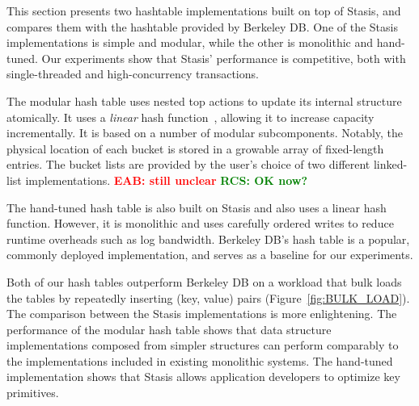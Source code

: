 \documentclass[letterpaper,twocolumn,10pt]{article}
\newcommand{\yad}{Stasis\xspace}
\newcommand{\yads}{Stasis'\xspace}
\newcommand{\eab}[1]{\textcolor{red}{\bf EAB: #1}}
\newcommand{\rcs}[1]{\textcolor{green}{\bf RCS: #1}}
\begin{document}
This section presents two hashtable implementations built on top of
\yad, and compares them with the hashtable provided by Berkeley DB.
One of the \yad implementations is simple and modular, while
the other is monolithic and hand-tuned.  Our experiments show that
\yads performance is competitive, both with single-threaded and
high-concurrency transactions.


The modular hash table uses nested top actions to update its internal
structure atomically.  It uses a {\em linear} hash
function~\cite{lht}, allowing it to increase capacity incrementally.
It is based on a number of modular subcomponents.  Notably, the
physical location of each bucket is stored in a growable array of
fixed-length entries.  The bucket lists are provided by the user's
choice of two different linked-list implementations. \eab{still
unclear} \rcs{OK now?}

The hand-tuned hash table is also built on \yad and also uses a linear hash
function.  However, it is monolithic and uses carefully ordered writes to
reduce runtime overheads such as log bandwidth.  Berkeley DB's
hash table is a popular, commonly deployed implementation, and serves
as a baseline for our experiments.

Both of our hash tables outperform Berkeley DB on a workload that bulk
loads the tables by repeatedly inserting (key, value) pairs
(Figure~\ref{fig:BULK_LOAD}).
The comparison between the \yad  implementations is more
enlightening.  The performance of the modular hash table shows that
data structure implementations composed from
simpler structures can perform comparably to the implementations included 
in existing monolithic systems.  The hand-tuned
implementation shows that \yad allows application developers to
optimize key primitives.
\end{document}
